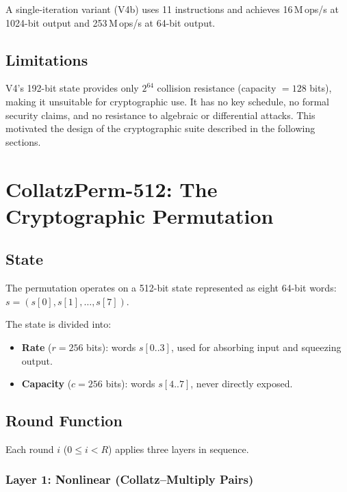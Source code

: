 \documentclass[11pt,a4paper]{article}
\begin{document}
A single-iteration variant (V4b) uses 11 instructions and achieves
16\,M\,ops/s at 1024-bit output and 253\,M\,ops/s at 64-bit output.

\subsection{Limitations}

V4's 192-bit state provides only $2^{64}$ collision resistance
(capacity $= 128$ bits), making it unsuitable for cryptographic use. It
has no key schedule, no formal security claims, and no resistance to
algebraic or differential attacks. This motivated the design of the
cryptographic suite described in the following sections.

\section{CollatzPerm-512: The Cryptographic Permutation}
\label{sec:perm}

\subsection{State}

The permutation operates on a 512-bit state represented as eight 64-bit
words: $s = (s[0], s[1], \ldots, s[7])$.

The state is divided into:
\begin{itemize}
    \item \textbf{Rate} ($r = 256$ bits): words $s[0..3]$, used for
          absorbing input and squeezing output.
    \item \textbf{Capacity} ($c = 256$ bits): words $s[4..7]$, never
          directly exposed.
\end{itemize}

\subsection{Round Function}

Each round $i$ ($0 \leq i < R$) applies three layers in sequence.

\subsubsection{Layer 1: Nonlinear (Collatz--Multiply Pairs)}
\end{document}
